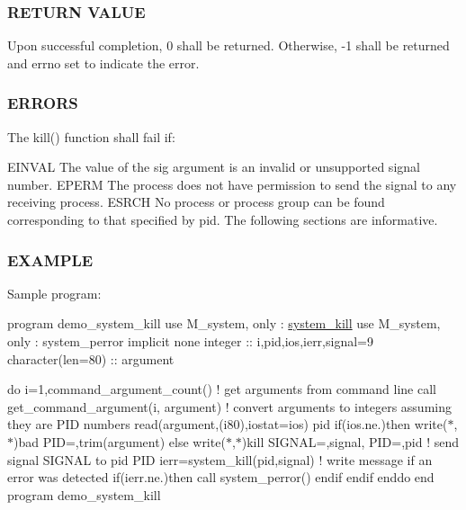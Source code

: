 \subsubsection*{R\+E\+T\+U\+RN V\+A\+L\+UE}

\begin{DoxyVerb}Upon successful completion, 0 shall be returned. Otherwise, -1 shall be
returned and errno set to indicate the error.
\end{DoxyVerb}


\subsubsection*{E\+R\+R\+O\+RS}

The kill() function shall fail if\+:

E\+I\+N\+V\+AL The value of the sig argument is an invalid or unsupported signal number. E\+P\+E\+RM The process does not have permission to send the signal to any receiving process. E\+S\+R\+CH No process or process group can be found corresponding to that specified by pid. The following sections are informative.

\subsubsection*{E\+X\+A\+M\+P\+LE}

Sample program\+:

program demo\+\_\+system\+\_\+kill use M\+\_\+system, only \+: \mbox{\hyperlink{interfacem__system_1_1system__kill}{system\+\_\+kill}} use M\+\_\+system, only \+: system\+\_\+perror implicit none integer \+:\+: i,pid,ios,ierr,signal=9 character(len=80) \+:\+: argument

do i=1,command\+\_\+argument\+\_\+count() ! get arguments from command line call get\+\_\+command\+\_\+argument(i, argument) ! convert arguments to integers assuming they are P\+ID numbers read(argument,\textquotesingle{}(i80)\textquotesingle{},iostat=ios) pid if(ios.\+ne.)then write($\ast$,$\ast$)\textquotesingle{}bad P\+ID=\textquotesingle{},trim(argument) else write($\ast$,$\ast$)\textquotesingle{}kill S\+I\+G\+N\+AL=\textquotesingle{},signal,\textquotesingle{} P\+ID=\textquotesingle{},pid ! send signal S\+I\+G\+N\+AL to pid P\+ID ierr=system\+\_\+kill(pid,signal) ! write message if an error was detected if(ierr.\+ne.)then call system\+\_\+perror(\textquotesingle{}) endif endif enddo end program demo\+\_\+system\+\_\+kill

